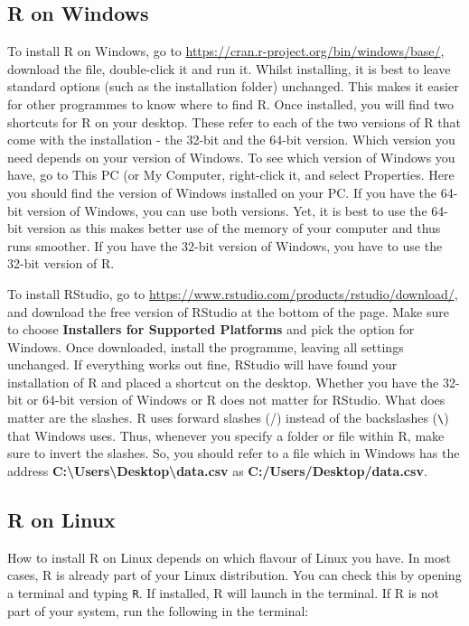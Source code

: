 \documentclass[
]{book}
\begin{document}
\hypertarget{r-on-windows}{%
\subsection{R on Windows}\label{r-on-windows}}

To install R on Windows, go to \url{https://cran.r-project.org/bin/windows/base/}, download the file, double-click it and run it. Whilst installing, it is best to leave standard options (such as the installation folder) unchanged. This makes it easier for other programmes to know where to find R. Once installed, you will find two shortcuts for R on your desktop. These refer to each of the two versions of R that come with the installation - the 32-bit and the 64-bit version. Which version you need depends on your version of Windows. To see which version of Windows you have, go to This PC (or My Computer, right-click it, and select Properties. Here you should find the version of Windows installed on your PC. If you have the 64-bit version of Windows, you can use both versions. Yet, it is best to use the 64-bit version as this makes better use of the memory of your computer and thus runs smoother. If you have the 32-bit version of Windows, you have to use the 32-bit version of R.

To install RStudio, go to \url{https://www.rstudio.com/products/rstudio/download/}, and download the free version of RStudio at the bottom of the page. Make sure to choose \textbf{Installers for Supported Platforms} and pick the option for Windows. Once downloaded, install the programme, leaving all settings unchanged. If everything works out fine, RStudio will have found your installation of R and placed a shortcut on the desktop. Whether you have the 32-bit or 64-bit version of Windows or R does not matter for RStudio. What does matter are the slashes. R uses forward slashes (/) instead of the backslashes (\texttt{\textbackslash{}}) that Windows uses. Thus, whenever you specify a folder or file within R, make sure to invert the slashes. So, you should refer to a file which in Windows has the address \textbf{C:\textbackslash Users\textbackslash Desktop\textbackslash data.csv} as \textbf{C:/Users/Desktop/data.csv}.

\hypertarget{r-on-linux}{%
\subsection{R on Linux}\label{r-on-linux}}

How to install R on Linux depends on which flavour of Linux you have. In most cases, R is already part of your Linux distribution. You can check this by opening a terminal and typing \texttt{R}. If installed, R will launch in the terminal. If R is not part of your system, run the following in the terminal:
\end{document}
